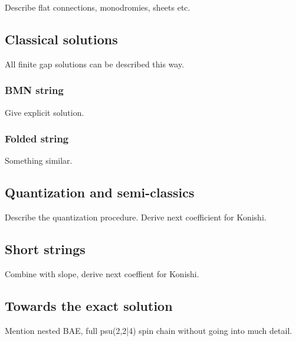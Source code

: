 Describe flat connections, monodromies, sheets etc.

\subsection{Classical solutions}

All finite gap solutions can be described this way.

\subsubsection{BMN string}

Give explicit solution.

\subsubsection{Folded string}

Something similar.

\subsection{Quantization and semi-classics}

Describe the quantization procedure. Derive next coefficient for Konishi.

\subsection{Short strings}

Combine with slope, derive next coeffient for Konishi.

\subsection{Towards the exact solution}






Mention nested BAE, full psu(2,2|4) spin chain without going into much detail.




